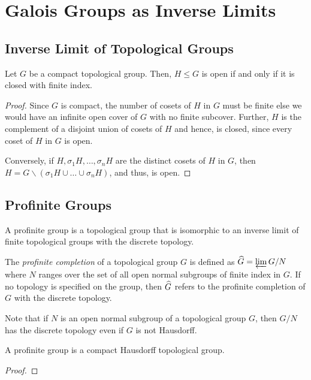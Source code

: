 \section{Galois Groups as Inverse Limits}
\subsection{Inverse Limit of Topological Groups}

\begin{lemma}
    Let $G$ be a compact topological group. Then, $H\le G$ is open if and only if it is closed with finite index.
\end{lemma}
\begin{proof}
    Since $G$ is compact, the number of cosets of $H$ in $G$ must be finite else we would have an infinite open cover of $G$ with no finite subcover. Further, $H$ is the complement of a disjoint union of cosets of $H$ and hence, is closed, since every coset of $H$ in $G$ is open. 

    Conversely, if $H,\sigma_1H,\dots,\sigma_n H$ are the distinct cosets of $H$ in $G$, then $H = G\backslash(\sigma_1 H\cup\dots\cup\sigma_n H)$, and thus, is open.
\end{proof}

\subsection{Profinite Groups}

\begin{definition}
    A profinite group is a topological group that is isomorphic to an inverse limit of finite topological groups with the discrete topology. 

    The \emph{profinite completion} of a topological group $G$ is defined as $\widehat{G} = \varprojlim G/N$ where $N$ ranges over the set of all open normal subgroups of finite index in $G$. If no topology is specified on the group, then $\widehat{G}$ refers to the profinite completion of $G$ with the discrete topology.
\end{definition}
\begin{remark}
    Note that if $N$ is an open normal subgroup of a topological group $G$, then $G/N$ has the discrete topology even if $G$ is not Hausdorff.
\end{remark}

\begin{theorem}
    A profinite group is a compact Hausdorff topological group.
\end{theorem}
\begin{proof}
    
\end{proof}

